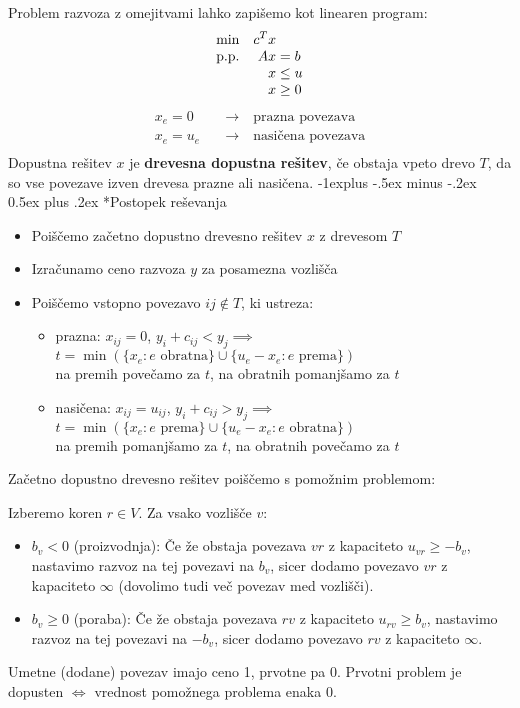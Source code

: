 \documentclass[a4paper,8pt]{extarticle}
\makeatletter
\renewcommand{\subsection}{\@startsection{subsection}{2}{0mm}%
                                {-1explus -.5ex minus -.2ex}%
                                {0.5ex plus .2ex}%
                                {\normalfont\normalsize\bfseries}}
\makeatother
\begin{document}
\begin{multicols}{4}
Problem razvoza z omejitvami lahko zapišemo kot linearen program:
\begin{align*}
	\begin{array}{l >{\displaystyle}r@{\;} l}
		\min 		& c^T x	\\		
		\text{p.p.} & Ax	& = b	 \\
					& x 	 						&\leq u	\\
					& x 	 						&\geq 0	
	\end{array}
\end{align*}
\begin{align*}
	x_e = 0 	\quad & \rightarrow \quad \text{prazna povezava} \\
	x_e = u_e 	\quad & \rightarrow \quad \text{nasičena povezava} \\
\end{align*}
Dopustna rešitev $x$ je \textbf{drevesna dopustna rešitev}, če obstaja vpeto drevo $T$, da so vse povezave izven drevesa prazne ali nasičena. 
\subsection*{Postopek reševanja}
\begin{itemize}
	\item Poiščemo začetno dopustno drevesno rešitev $x$ z drevesom $T$
	\item Izračunamo ceno razvoza $y$ za posamezna vozlišča
	\item Poiščemo vstopno povezavo $ij \notin T$, ki ustreza:
	\begin{itemize}
		\item prazna: $x_{ij} = 0$, $y_i + c_{ij} < y_j \implies $ \\
		$ t = \min \left( \{x_e : e \text{ obratna}\} \cup \{u_e-x_e : e \text{ prema}\}\right)$ \\
		na premih povečamo za $t$, na obratnih pomanjšamo za $t$
		\item nasičena: $x_{ij} = u_{ij}$, $y_i + c_{ij} > y_j \implies $ \\
		$ t = \min \left( \{x_e : e \text{ prema}\} \cup \{u_e-x_e : e \text{ obratna}\}\right)$ \\
		na premih pomanjšamo za $t$, na obratnih povečamo za $t$
	\end{itemize}
\end{itemize}

Začetno dopustno drevesno rešitev poiščemo s pomožnim problemom:

Izberemo koren $r \in V$. Za vsako vozlišče $v$:
\begin{itemize}
	\item $b_v < 0$ (proizvodnja): Če že obstaja povezava $vr$ z kapaciteto $u_{vr} \geq -b_v$, nastavimo razvoz na tej povezavi na $b_v$, sicer dodamo povezavo $vr$ z kapaciteto $\infty$ (dovolimo tudi več povezav med vozlišči).
	\item $b_v \geq 0$ (poraba): Če že obstaja povezava $rv$ z kapaciteto $u_{rv} \geq b_v$, nastavimo razvoz na tej povezavi na $-b_v$, sicer dodamo povezavo $rv$ z kapaciteto $\infty$.
\end{itemize}

Umetne (dodane) povezav imajo ceno 1, prvotne pa 0. Prvotni problem je dopusten $\iff$ vrednost pomožnega problema enaka 0.


\end{multicols}
\end{document}
